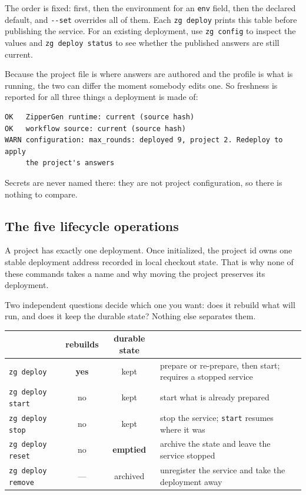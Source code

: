 \documentclass[11pt,a4paper]{article}
\begin{document}
The order is fixed:  first, then the environment for an
\texttt{env} field, then the declared default, and \texttt{-{}-set} overrides
all of them. Each \texttt{zg deploy} prints this table before publishing the
service. For an existing deployment, use \texttt{zg config} to inspect the
values and \texttt{zg deploy status} to see whether the published answers are
still current.

Because the project file is where answers are authored and the profile is what
is running, the two can differ the moment somebody edits one. So freshness is
reported for all three things a deployment is made of:

\begin{lstlisting}[style=shell]
OK   ZipperGen runtime: current (source hash)
OK   workflow source: current (source hash)
WARN configuration: max_rounds: deployed 9, project 2. Redeploy to apply
     the project's answers
\end{lstlisting}

Secrets are never named there: they are not project configuration, so there is
nothing to compare.

\subsection{The five lifecycle operations}

A project has exactly one deployment. Once initialized, the project id owns one
stable deployment address recorded in local checkout state. That is why none of
these commands takes a name and why moving the project preserves its deployment.

Two independent questions decide which one you want: does it rebuild what will
run, and does it keep the durable state? Nothing else separates them.

\begin{center}
\begin{tabularx}{0.98\linewidth}{@{}l c c X@{}}
\toprule
 & rebuilds & durable state & \\
\midrule
\texttt{zg deploy} & \textbf{yes} & kept & prepare or re-prepare, then start; requires a stopped service \\
\texttt{zg deploy start} & no & kept & start what is already prepared \\
\texttt{zg deploy stop} & no & kept & stop the service; \texttt{start} resumes where it was \\
\texttt{zg deploy reset} & no & \textbf{emptied} & archive the state and leave the service stopped \\
\texttt{zg deploy remove} & --- & archived & unregister the service and take the deployment away \\
\bottomrule
\end{tabularx}
\end{center}
\end{document}
